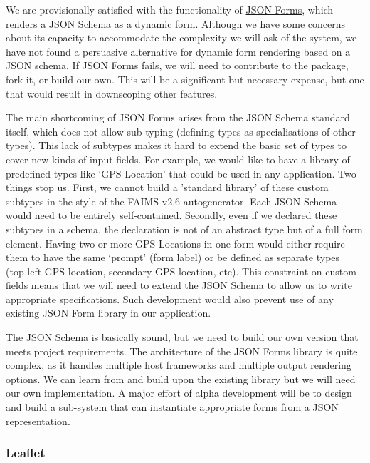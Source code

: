 \documentclass[a4paper,headings=small fontsize=10pt]{scrreprt}
\begin{document}
We are provisionally satisfied with the functionality of
\href{https://jsonforms.io/}{{JSON Forms}}, which renders a JSON Schema
as a dynamic form. Although we have some concerns about its capacity to
accommodate the complexity we will ask of the system, we have not found
a persuasive alternative for dynamic form rendering based on a JSON
schema. If JSON Forms fails, we will need to contribute to the package,
fork it, or build our own. This will be a significant but necessary
expense, but one that would result in downscoping other features.

The main shortcoming of JSON Forms arises from the JSON Schema standard
itself, which does not allow sub-typing (defining types as
specialisations of other types). This lack of subtypes makes it hard to
extend the basic set of types to cover new kinds of input fields. For
example, we would like to have a library of predefined types like `GPS
Location' that could be used in any application. Two things stop us.
First, we cannot build a 'standard library' of these custom subtypes in
the style of the FAIMS v2.6 autogenerator. Each JSON Schema would need
to be entirely self-contained. Secondly, even if we declared these
subtypes in a schema, the declaration is not of an abstract type but of
a full form element. Having two or more GPS Locations in one form would
either require them to have the same `prompt' (form label) or be defined
as separate types (top-left-GPS-location, secondary-GPS-location, etc).
This constraint on custom fields means that we will need to extend the
JSON Schema to allow us to write appropriate specifications. Such
development would also prevent use of any existing JSON Form library in
our application.

The JSON Schema is basically sound, but we need to build our own version
that meets project requirements. The architecture of the JSON Forms
library is quite complex, as it handles multiple host frameworks and
multiple output rendering options. We can learn from and build upon the
existing library but we will need our own implementation. A major effort
of alpha development will be to design and build a sub-system that can
instantiate appropriate forms from a JSON representation.

\subsubsection{Leaflet}
\end{document}

